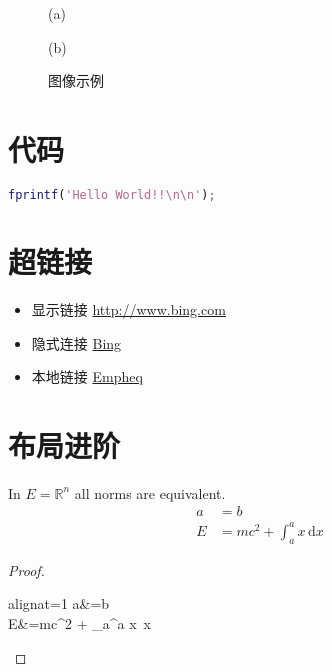 \begin{figure}[htbp]
    \centering
    \begin{minipage}[t]{0.2\linewidth}
        \footnotesize{\centerline{(a)}}
    \end{minipage}
    \hspace{0.2\linewidth}
    \begin{minipage}[t]{0.2\linewidth}
        \footnotesize{\centerline{(b)}}
    \end{minipage}
    \caption{图像示例}
	\label{fig.1}
\end{figure}


\section{代码}
\label{sec.Code}

\begin{lstlisting}[language=Matlab]
fprintf('Hello World!!\n\n');
\end{lstlisting}


\section{超链接}
\label{sec.Hyperlinks}

\begin{itemize}
	\item 显示链接
	\url{http://www.bing.com}
	\item 隐式连接
	\href{http://www.bing.com}{Bing}	%
	\item 本地链接
	\href{run:./Links/empheq.pdf}{Empheq}		%
\end{itemize}


\section{布局进阶}
\label{sec.Layout}

\begin{theorem}
In $E=\mathbb{R}^n$ all norms are equivalent.
\begin{align}
	a &= b\\
	E &= mc^2 + \int_a^a x\, \mathrm{d}x
\end{align}
\end{theorem}

\begin{proof}
	\begin{empheq}[left=L\Rightarrow\Rrightarrow\empheqlbrace, box=\mymathbox, right=\empheqrbrack\Lleftarrow\Leftarrow R]{alignat=1}
		a&=b \nonumber \\
		E&=mc^2 + \int_a^a x\, x
	\end{empheq}
\end{proof}


